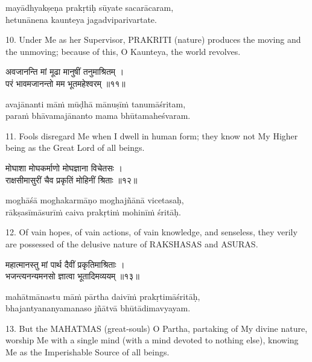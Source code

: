 \begin{transliteration}
mayādhyakṣeṇa prakṛtiḥ sūyate sacarācaram, \\
hetunānena kaunteya jagadviparivartate.
\end{transliteration}

10. Under Me as her Supervisor, PRAKRITI (nature) produces the moving and the
unmoving; because of this, O Kaunteya, the world revolves.

\begin{gitaverse}
अवजानन्ति मां मूढा मानुषीं तनुमाश्रितम् । \\
परं भावमजानन्तो मम भूतमहेश्वरम् ॥११॥
\end{gitaverse}

\begin{transliteration}
avajānanti māṁ mūḍhā mānuṣīṁ tanumāśritam, \\
paraṁ bhāvamajānanto mama bhūtamaheśvaram.
\end{transliteration}

11. Fools disregard Me when I dwell in human form; they know not My Higher
being as the Great Lord of all beings.

\begin{gitaverse}
मोघाशा मोघकर्माणो मोघज्ञाना विचेतसः । \\
राक्षसीमासुरीं चैव प्रकृतिं मोहिनीं श्रिताः ॥१२॥
\end{gitaverse}

\begin{transliteration}
moghāśā moghakarmāṇo moghajñānā vicetasaḥ, \\
rākṣasīmāsurīṁ caiva prakṛtiṁ mohinīṁ śritāḥ.
\end{transliteration}

12. Of vain hopes, of vain actions, of vain knowledge, and senseless, they
verily are possessed of the delusive nature of RAKSHASAS and ASURAS.\@

\begin{gitaverse}
महात्मानस्तु मां पार्थ दैवीं प्रकृतिमाश्रिताः । \\
भजन्त्यनन्यमनसो ज्ञात्वा भूतादिमव्ययम् ॥१३॥
\end{gitaverse}

\begin{transliteration}
mahātmānastu māṁ pārtha daivīṁ prakṛtimāśritāḥ, \\
bhajantyananyamanaso jñātvā bhūtādimavyayam.
\end{transliteration}

13. But the MAHATMAS (great-souls) O Partha, partaking of My divine nature,
worship Me with a single mind (with a mind devoted to nothing else), knowing Me
as the Imperishable Source of all beings.

